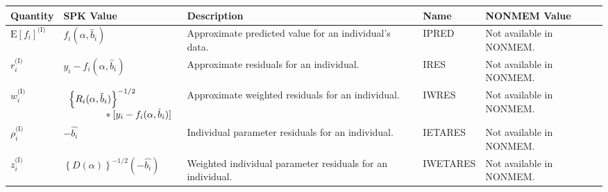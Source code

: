 \documentclass{article}
\begin{document}
\begin{center}
\begin{tabular}{|p{0.75in}|p{3.25in}|p{1.1in}|p{0.85in}|p{1.0in}|}
\hline
\hline
  {\bf Quantity}
    & {\bf SPK Value}
    & {\bf Description}
    & {\bf Name}
    & {\bf NONMEM Value} \\
  \hline
  \hline
  $\mbox{E} \left[ f_i \right]^{\mbox{(I)}}$
    & $f_i(\alpha, \hat{b}_i)$
    & Approximate predicted value for an individual's data.
    & IPRED 
    & Not available in NONMEM.\\
  \hline
  $r^{\mbox{(I)}}_i$
    & $y_i - f_i(\alpha, \hat{b}_i)$
    & Approximate residuals for an individual.
    & IRES 
    & Not available in NONMEM.\\
  \hline
  $w^{\mbox{(I)}}_i$
    & $\begin{array}{l}
        \left\{ R_i(\alpha, \hat{b}_i) \right\}^{-1/2} \\
        \mbox{\hspace{0.5in}}
        \ast [ y_i - f_i(\alpha, \hat{b}_i)]
      \end{array} $
    & Approximate weighted residuals for an individual.
    & IWRES 
    & Not available in NONMEM.\\
  \hline
  $\rho^{\mbox{(I)}}_i$
    & $-\hat{b_i}$
    & Individual parameter residuals for an individual.
    & IETARES
    & Not available in NONMEM. \\
  \hline
  $z^{\mbox{(I)}}_i$
    & $\left\{ D(\alpha) \right\}^{-1/2} ( - \hat{b_i} )$
    & Weighted individual parameter residuals for an individual.
    & IWETARES
    & Not available in NONMEM. \\
  \hline
  \hline
\end{tabular}
\end{center}


%
%

%
%
\end{document}
